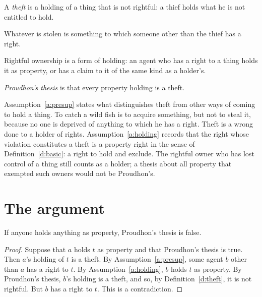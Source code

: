 \documentclass{situationist-preprint}
\begin{document}
\begin{definition}\label{d:theft}
A \emph{theft} is a holding of a thing that is not rightful: a thief holds what he is not entitled to hold.
\end{definition}

\begin{assumption}\label{a:presup}
Whatever is stolen is something to which someone other than the thief has a right.
\end{assumption}

\begin{assumption}\label{a:holding}
Rightful ownership is a form of holding: an agent who has a right to a thing holds it as property, or has a claim to it of the same kind as a holder's.
\end{assumption}

\begin{definition}\label{d:thesis}
\emph{Proudhon's thesis} is that every property holding is a theft.
\end{definition}

Assumption~\ref{a:presup} states what distinguishes theft from other ways of coming to hold a thing. To catch a wild fish is to acquire something, but not to steal it, because no one is deprived of anything to which he has a right. Theft is a wrong done to a holder of rights. Assumption~\ref{a:holding} records that the right whose violation constitutes a theft is a property right in the sense of Definition~\ref{d:basic}: a right to hold and exclude. The rightful owner who has lost control of a thing still counts as a holder; a thesis about all property that exempted such owners would not be Proudhon's.

\section{The argument}

\begin{theorem}\label{t:main}
If anyone holds anything as property, Proudhon's thesis is false.
\end{theorem}

\begin{proof}
Suppose that $a$ holds $t$ as property and that Proudhon's thesis is true. Then $a$'s holding of $t$ is a theft. By Assumption~\ref{a:presup}, some agent $b$ other than $a$ has a right to $t$. By Assumption~\ref{a:holding}, $b$ holds $t$ as property. By Proudhon's thesis, $b$'s holding is a theft, and so, by Definition~\ref{d:theft}, it is not rightful. But $b$ has a right to $t$. This is a contradiction.
\end{proof}
\end{document}
